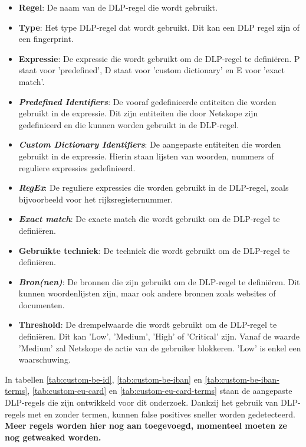 {\small
\begin{itemize}
    \item \textbf{Regel}: De naam van de DLP-regel die wordt gebruikt.
    \item \textbf{Type}: Het type DLP-regel dat wordt gebruikt. Dit kan een DLP regel zijn of een fingerprint.
    \item \textbf{Expressie}: De expressie die wordt gebruikt om de DLP-regel te definiëren. P staat voor 'predefined', D staat voor 'custom dictionary' en E voor 'exact match'.
    \item \textbf{\textit{Predefined Identifiers}}: De vooraf gedefinieerde entiteiten die worden gebruikt in de expressie. Dit zijn entiteiten die door Netskope zijn gedefinieerd en die kunnen worden gebruikt in de DLP-regel.
    \item \textbf{\textit{Custom Dictionary Identifiers}}: De aangepaste entiteiten die worden gebruikt in de expressie. Hierin staan lijsten van woorden, nummers of reguliere expressies gedefinieerd. 
    \item \textbf{\textit{RegEx}}: De reguliere expressies die worden gebruikt in de DLP-regel, zoals bijvoorbeeld voor het rijksregisternummer.
    \item \textbf{\textit{Exact match}}: De exacte match die wordt gebruikt om de DLP-regel te definiëren. 
    \item \textbf{Gebruikte techniek}: De techniek die wordt gebruikt om de DLP-regel te definiëren.
    \item \textbf{\textit{Bron(nen)}}: De bronnen die zijn gebruikt om de DLP-regel te definiëren. Dit kunnen woordenlijsten zijn, maar ook andere bronnen zoals websites of documenten.
    \item \textbf{Threshold}: De drempelwaarde die wordt gebruikt om de DLP-regel te definiëren. Dit kan 'Low', 'Medium', 'High' of 'Critical' zijn. Vanaf de waarde 'Medium' zal Netskope de actie van de gebruiker blokkeren. 'Low' is enkel een waarschuwing.
\end{itemize}
}

In tabellen \ref{tab:custom-be-id}, \ref{tab:custom-be-iban} en \ref{tab:custom-be-iban-terms}, \ref{tab:custom-eu-card} en \ref{tab:custom-eu-card-terms} staan de aangepaste DLP-regels die zijn ontwikkeld voor dit onderzoek. 
Dankzij het gebruik van DLP-regels met en zonder termen, kunnen false positives sneller worden gedetecteerd. 
\textbf{Meer regels worden hier nog aan toegevoegd, momenteel moeten ze nog getweaked worden.}


